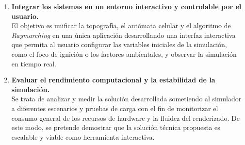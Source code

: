 \begin{enumerate}
    \item \textbf{Integrar los sistemas en un entorno interactivo y controlable por el usuario.} \\
    El objetivo es unificar la topografía, el autómata celular y el algoritmo de \textit{Raymarching} en una única aplicación desarrollando una interfaz interactiva que permita al usuario configurar las variables iniciales de la simulación, como el foco de ignición o los factores ambientales, y observar la simulación en tiempo real.
    
    \item \textbf{Evaluar el rendimiento computacional y la estabilidad de la simulación.} \\
    Se trata de analizar y medir la solución desarrollada sometiendo al simulador  a diferentes escenarios y pruebas de carga con el fin de monitorizar el consumo general de los recursos de hardware y la fluidez del renderizado. De este modo, se pretende demostrar que la solución técnica propuesta es escalable y viable como herramienta interactiva.

\end{enumerate}


\clearpage


